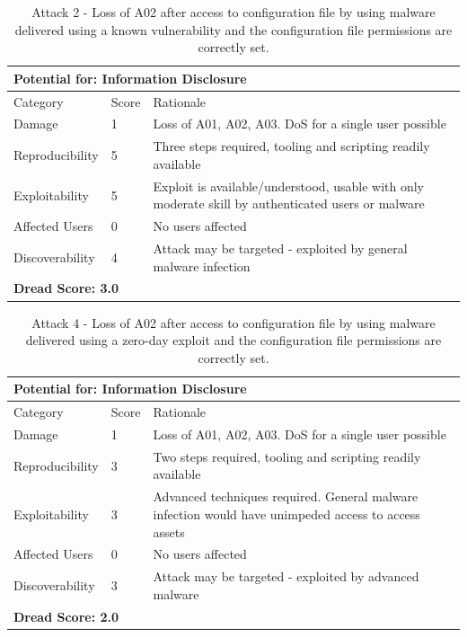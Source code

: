 \documentclass [11pt, proquest] {uwthesis}[2020/02/24]
\begin{document}
\begin{table}[H]
\label{attack2-hsm}
\begin{tabular}{|m{3cm}|m{.9cm}|p{27em} |}
\multicolumn{3}{l}{Potential for: Information Disclosure}                   \\
\hline
Category & Score & Rationale \\
\hline
Damage          & 1     & Loss of A01, A02, A03. DoS for a single user possible            \\
\hline
Reproducibility & 5     & Three steps required, tooling and scripting readily available    \\
\hline
Exploitability & 5      & Exploit is available/understood, usable with only moderate skill by authenticated users or malware \\
\hline
Affected Users  & 0     &  No users affected                         \\
\hline
Discoverability & 4     & Attack may be targeted - exploited by general malware infection \\
\hline
\multicolumn{3}{l}{\textbf{Dread Score: 3.0}} 
\end{tabular}
\caption{Attack 2 - Loss of A02 after access to configuration file by using malware delivered using a known vulnerability and the configuration file permissions are correctly set.}
\end{table}
\begin{table}[H]
\label{attack4-hsm}
\begin{tabular}{|m{3cm}|m{.9cm}|p{27em} |}
\multicolumn{3}{l}{Potential for: Information Disclosure}                   \\
\hline
Category & Score & Rationale \\
\hline
Damage          & 1     & Loss of A01, A02, A03. DoS for a single user possible            \\
\hline
Reproducibility & 3     & Two steps required, tooling and scripting readily available    \\
\hline
Exploitability & 3      & Advanced techniques required. General malware infection would have unimpeded access to access assets  \\
\hline
Affected Users  & 0     &  No users affected                         \\
\hline
Discoverability & 3     & Attack may be targeted - exploited by advanced malware \\
\hline
\multicolumn{3}{l}{\textbf{Dread Score: 2.0}} 
\end{tabular}

\caption{Attack 4 - Loss of A02 after access to configuration file by using malware delivered using a zero-day exploit and the configuration file permissions are correctly set.}
\end{table}
\end{document}
